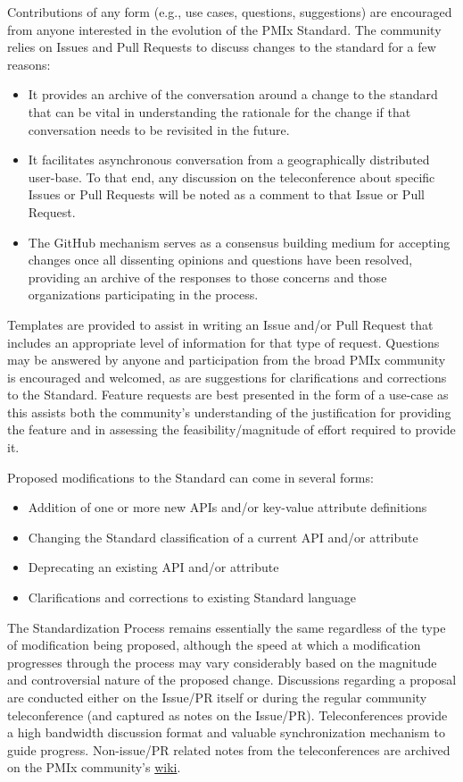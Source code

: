 \documentclass{article}
\begin{document}
Contributions of any form (e.g., use cases, questions, suggestions) are
encouraged from anyone interested in the evolution of the PMIx Standard.
The community relies on Issues and Pull Requests to discuss changes to
the standard for a few reasons:

\begin{itemize}
\item
  It provides an archive of the conversation around a change to the
  standard that can be vital in understanding the rationale for the
  change if that conversation needs to be revisited in the future.
\item
  It facilitates asynchronous conversation from a geographically
  distributed user-base. To that end, any discussion on the
  teleconference about specific Issues or Pull Requests will be noted as
  a comment to that Issue or Pull Request.
\item
  The GitHub mechanism serves as a consensus building medium for
  accepting changes once all dissenting opinions and questions have been
  resolved, providing an archive of the responses to those concerns and
  those organizations participating in the process.
\end{itemize}

Templates are provided to assist in writing an Issue and/or Pull Request
that includes an appropriate level of information for that type of
request. Questions may be answered by anyone and participation from the
broad PMIx community is encouraged and welcomed, as are suggestions for
clarifications and corrections to the Standard. Feature requests are
best presented in the form of a use-case as this assists both the
community's understanding of the justification for providing the feature
and in assessing the feasibility/magnitude of effort required to provide
it.

Proposed modifications to the Standard can come in several forms:

\begin{itemize}
\item
  Addition of one or more new APIs and/or key-value attribute
  definitions
\item
  Changing the Standard classification of a current API and/or attribute
\item
  Deprecating an existing API and/or attribute
\item
  Clarifications and corrections to existing Standard language
\end{itemize}

The Standardization Process remains essentially the same regardless of
the type of modification being proposed, although the speed at which a
modification progresses through the process may vary considerably based
on the magnitude and controversial nature of the proposed change.
Discussions regarding a proposal are conducted either on the Issue/PR
itself or during the regular community teleconference (and captured as
notes on the Issue/PR). Teleconferences provide a high bandwidth
discussion format and valuable synchronization mechanism to guide
progress. Non-issue/PR related notes from the teleconferences are
archived on the PMIx community's
\href{https://github.com/pmix/pmix-standard/wiki\#meeting-information}{wiki}.
\end{document}
